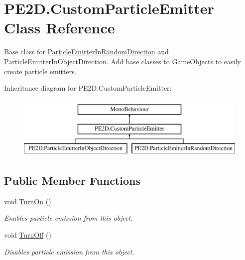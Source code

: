 \hypertarget{class_p_e2_d_1_1_custom_particle_emitter}{}\section{P\+E2\+D.\+Custom\+Particle\+Emitter Class Reference}
\label{class_p_e2_d_1_1_custom_particle_emitter}


Base class for \hyperlink{class_p_e2_d_1_1_particle_emitter_in_random_direction}{Particle\+Emitter\+In\+Random\+Direction} and \hyperlink{class_p_e2_d_1_1_particle_emitter_in_object_direction}{Particle\+Emitter\+In\+Object\+Direction}. Add base classes to Game\+Objects to easily create particle emitters.  


Inheritance diagram for P\+E2\+D.\+Custom\+Particle\+Emitter\+:\begin{figure}[H]
\begin{center}
\leavevmode
\includegraphics[height=3.000000cm]{class_p_e2_d_1_1_custom_particle_emitter}
\end{center}
\end{figure}
\subsection*{Public Member Functions}
\begin{DoxyCompactItemize}
\item 
void \hyperlink{class_p_e2_d_1_1_custom_particle_emitter_ab3e25c169bd7782b2982daab30e35bb8}{Turn\+On} ()
\begin{DoxyCompactList}\small\item\em Enables particle emission from this object. \end{DoxyCompactList}\item 
void \hyperlink{class_p_e2_d_1_1_custom_particle_emitter_a95849554a11e3072101bc3a74ea249af}{Turn\+Off} ()
\begin{DoxyCompactList}\small\item\em Disables particle emission from this object. \end{DoxyCompactList}\end{DoxyCompactItemize}
